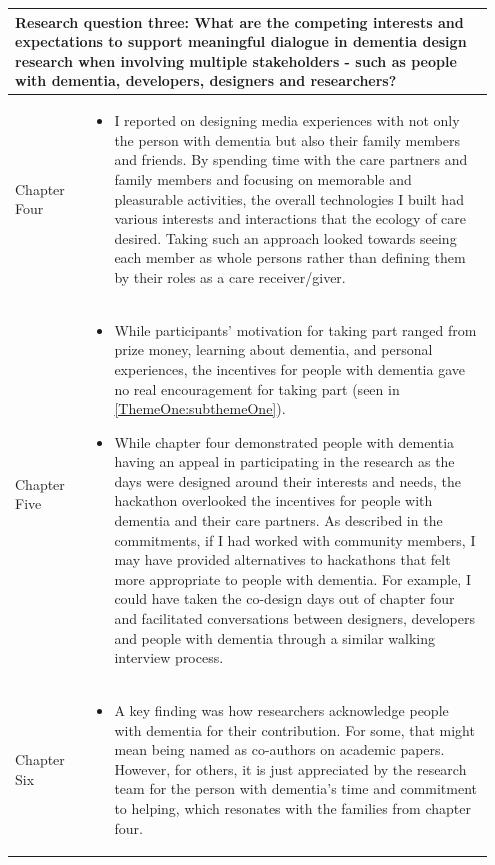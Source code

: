 \begin{table}[htp]
    \centering
    \begin{tabular}{p{0.15\linewidth} | p{0.8\linewidth}}
    \multicolumn{2}{p{0.95\linewidth}}{\textbf{Research question three: What are the competing interests and expectations to support meaningful dialogue in dementia design research when involving multiple stakeholders - such as people with dementia, developers, designers and researchers?}} \\ \hline
      Chapter Four &
          \begin{itemize}
          \item I reported on designing media experiences with not only the person with dementia but also their family members and friends. By spending time with the care partners and family members and focusing on memorable and pleasurable activities, the overall technologies I built had various interests and interactions that the ecology of care desired. Taking such an approach looked towards seeing each member as whole persons rather than defining them by their roles as a care receiver/giver.
      \end{itemize}
   \\ \hline
    Chapter Five &
    \begin{itemize}
          \item While participants' motivation for taking part ranged from prize money, learning about dementia, and personal experiences, the incentives for people with dementia gave no real encouragement for taking part (seen in \ref{ThemeOne:subthemeOne}). 

          \item While chapter four demonstrated people with dementia having an appeal in participating in the research as the days were designed around their interests and needs, the hackathon overlooked the incentives for people with dementia and their care partners. As described in the commitments, if I had worked with community members, I may have provided alternatives to hackathons that felt more appropriate to people with dementia. For example, I could have taken the co-design days out of chapter four and facilitated conversations between designers, developers and people with dementia through a similar walking interview process.
      \end{itemize}
  \\ \hline
    Chapter Six &
    \begin{itemize}
          \item A key finding was how researchers acknowledge people with dementia for their contribution. For some, that might mean being named as co-authors on academic papers. However, for others, it is just appreciated by the research team for the person with dementia's time and commitment to helping, which resonates with the families from chapter four.


\end{itemize}
\end{tabular}
\end{table}
